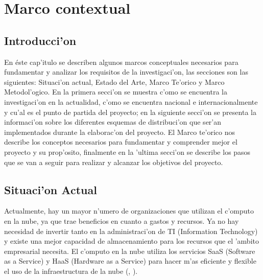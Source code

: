 
\chapter{Marco contextual}
\section*{Introducci'on}

En éste cap'itulo se describen algunos marcos conceptuales necesarios para fundamentar y analizar los requisitos de la investigaci'on, las secciones son las siguientes: Situaci'on actual, Estado del Arte, Marco Te'orico y Marco Metodol'ogico. En la primera secci'on se muestra c'omo se encuentra la investigaci'on en la actualidad, c'omo se encuentra nacional e internacionalmente y cu'al es el punto de partida del proyecto; en la siguiente secci'on se presenta la informaci'on sobre los diferentes esquemas de distribuci'on que ser'an implementados durante la elaborac'on del proyecto. El Marco te'orico nos describe los conceptos necesarios para fundamentar y comprender mejor el proyecto y su prop'osito, finalmente en la 'ultima secci'on se describe los pasos que se van a seguir para realizar y alcanzar los objetivos del proyecto.

\newpage


\section{Situaci'on Actual}

Actualmente, hay un mayor n'umero de organizaciones que utilizan el c'omputo en la nube, ya que trae beneficios en cuanto a gastos y recursos. Ya no hay necesidad de invertir tanto en la administraci'on de TI (Information Technology) y existe una mejor capacidad de almacenamiento para los recursos que el 'ambito empresarial necesita.
El c'omputo en la nube utiliza los servicios SaaS (Software as a Service) y HaaS (Hardware as a Service) para hacer m'as eficiente y flexible el uso de la infraestructura de la nube (\citeauthor{mariscal2013computo}, \citeyear{mariscal2013computo}). 

